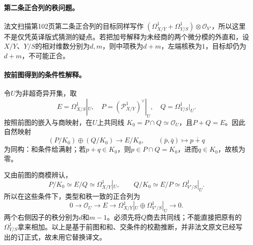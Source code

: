 \documentclass[openany,fontset=fandol]{ctexbook}
\newcommand{\Oa}{\mathcal O}
\begin{document}
\paragraph{第二条正合列的秩问题。}
法文扫描第102页第二条正合列的目标同样写作
$(\Omega^1_{X/Y}+\Omega^1_{Y/S})\otimes\Oa_{V'}$，所以这里不是仅凭英译版式猜测的疑点。若把加号解释为未经商的两个微分模的外直和，设$X/Y$、$Y/S$的相对维数分别为$d,m$，则中项秩为$d+m$，左端核秩为$1$，目标却仍为$d+m$，不可能正合。

\paragraph{按前图得到的条件性解释。}
令$U$为非超奇异开集，取
\[
E=\Omega^1_{X/S}|_U,\quad
P=(\mathcal P^1_{X/Y})^\vee|_U,\quad
Q=\Omega^1_{Y/S}|_U.
\]
按照前图的嵌入与商映射，在$U$上共同线
$K_0=P\cap Q\simeq\Oa_U$，且$P+Q=E$。因此自然映射
\[
(P/K_0)\oplus(Q/K_0)\longrightarrow E/K_0,
\qquad(\bar p,\bar q)\longmapsto\overline{p+q}
\]
为同构：和条件给满射；若$p+q\in K_0$，则$p\in P\cap Q=K_0$，进而$q\in K_0$，故核为零。

又由前图的商模辨认，
\[
P/K_0\simeq E/Q\simeq\Omega^1_{X/Y}|_U,
\qquad
Q/K_0\simeq E/P\simeq\Omega^1_{V'/S}|_U.
\]
所以在这些条件下，类型和秩一致的正合列为
\[
0\longrightarrow\Oa_U\longrightarrow E\longrightarrow
\Omega^1_{X/Y}|_U\oplus\Omega^1_{V'/S}|_U\longrightarrow0.
\]
两个右侧因子的秩分别为$d$和$m-1$。必须先将$Q$商去共同线；不能直接把原有的$\Omega^1_{Y/S}$拿来相加。以上是基于前图和和、交条件的校勘推断，并非法文原文已经写出的订正式，故未用它替换译文。
\end{document}
